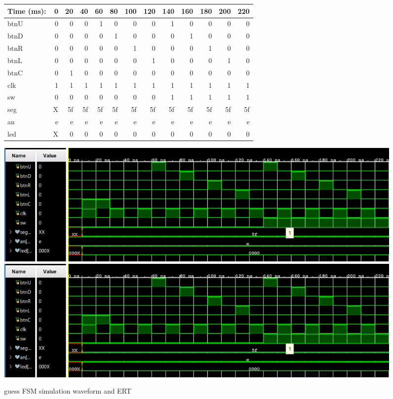 \documentclass[11pt]{article}
\begin{document}
\begin{figure}[ht]\centering
	\begin{tabular}{l|rrrrrrrrrrrr}
		Time (ms): & 0 & 20 & 40 & 60 & 80  & 100 & 120 & 140 & 160 & 180 & 200 & 220 \\
		\midrule
		btnU & 0 & 0 & 0 & 1 & 0 & 0 & 0 & 1 & 0 & 0 & 0 & 0  \\
		btnD & 0 & 0 & 0 & 0 & 1 & 0 & 0 & 0 & 1 & 0 & 0 & 0  \\
		btnR & 0 & 0 & 0 & 0 & 0 & 1 & 0 & 0 & 0 & 1 & 0 & 0  \\
		btnL & 0 & 0 & 0 & 0 & 0 & 0 & 1 & 0 & 0 & 0 & 1 & 0  \\
		btnC & 0 & 1 & 0 & 0 & 0 & 0 & 0 & 0 & 0 & 0 & 0 & 0  \\
		clk & 1 & 1 & 1 & 1 & 1 & 1 & 1 & 1 & 1 & 1 & 1 & 1  \\
		sw & 0 & 0 & 0 & 0 & 0 & 0 & 0 & 1 & 1 & 1 & 1 & 1  \\
		\midrule
		seg & X & 5f & 5f & 5f & 5f & 5f & 5f & 5f & 5f & 5f & 5f & 5f  \\
		an & e & e & e & e & e & e & e & e & e & e & e & e  \\
		led & X & 0 & 0 & 0 & 0 & 0 & 0 & 0 & 0 & 0 & 0 & 0  \\
		\bottomrule
	\end{tabular}\medskip
	
	\includegraphics[trim=0cm 0cm 9cm 0cm,clip]{guessing_game_test.JPG}
	\includegraphics[trim=14.5cm 0cm 0cm 0cm,clip]{guessing_game_test.JPG}
	
	\caption{guess FSM simulation waveform and ERT}
	\label{fig:sim_with_table}
\end{figure}
\clearpage
\end{document}
